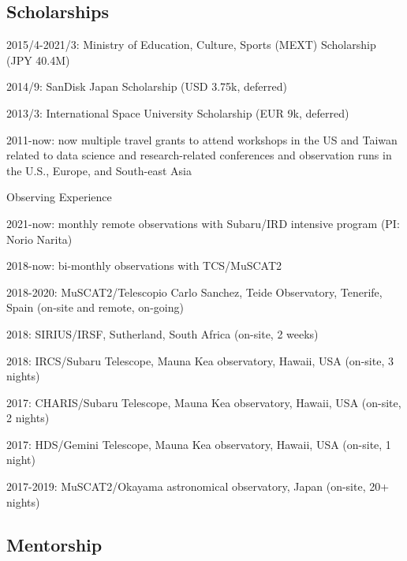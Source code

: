 \documentclass[12pt,letterpaper]{article}
\begin{document}
\fi

\subsection{Scholarships}
\begin{list}{}{\cvlist}
  \item 2015/4-2021/3: Ministry of Education, Culture, Sports (MEXT) Scholarship (JPY 40.4M)
  \item 2014/9: SanDisk Japan Scholarship (USD 3.75k, deferred)
  \item 2013/3: International Space University Scholarship (EUR 9k, deferred)
  \item 2011-now: now multiple travel grants to attend workshops in the US and Taiwan related to data science and research-related conferences and observation runs in the U.S., Europe, and South-east Asia
\end{list}

Observing Experience
\begin{list}{}{\cvlist}
  \item 2021-now: monthly remote observations with Subaru/IRD intensive program (PI: Norio Narita) 
  \item 2018-now: bi-monthly observations with TCS/MuSCAT2
  \item 2018-2020: MuSCAT2/Telescopio Carlo Sanchez, Teide Observatory, Tenerife, Spain (on-site and remote, on-going)
  \item 2018: SIRIUS/IRSF, Sutherland, South Africa (on-site, 2 weeks)
  \item 2018: IRCS/Subaru Telescope, Mauna Kea observatory, Hawaii, USA (on-site, 3 nights)
  \item 2017: CHARIS/Subaru Telescope, Mauna Kea observatory, Hawaii, USA (on-site, 2 nights)
  \item 2017: HDS/Gemini Telescope, Mauna Kea observatory, Hawaii, USA (on-site, 1 night)
  \item 2017-2019: MuSCAT2/Okayama astronomical observatory, Japan (on-site, 20+ nights)
\end{list}

\subsection{Mentorship}
\end{document}

